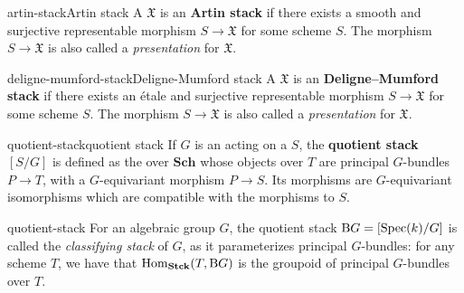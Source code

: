 \begin{topic}{artin-stack}{Artin stack}
    A  $\mathfrak{X}$ is an \textbf{Artin stack} if there exists a smooth and surjective representable morphism $S \to \mathfrak{X}$ for some scheme $S$. The morphism $S \to \mathfrak{X}$ is also called a \textit{presentation} for $\mathfrak{X}$.
\end{topic}

\begin{topic}{deligne-mumford-stack}{Deligne-Mumford stack}
    A  $\mathfrak{X}$ is an \textbf{Deligne--Mumford stack} if there exists an étale and surjective representable morphism $S \to \mathfrak{X}$ for some scheme $S$. The morphism $S \to \mathfrak{X}$ is also called a \textit{presentation} for $\mathfrak{X}$.
\end{topic}

\begin{topic}{quotient-stack}{quotient stack}
    If $G$ is an  acting on a  $S$, the \textbf{quotient stack} $[S/G]$ is defined as the  over $\textbf{Sch}$ whose objects over $T$ are principal $G$-bundles $P \to T$, with a $G$-equivariant morphism $P \to S$. Its morphisms are $G$-equivariant isomorphisms which are compatible with the morphisms to $S$.
\end{topic}

\begin{example}{quotient-stack}
    For an algebraic group $G$, the quotient stack $\textup{B}G = [\operatorname{Spec}(k) / G]$ is called the \textit{classifying stack} of $G$, as it parameterizes principal $G$-bundles: for any scheme $T$, we have that $\operatorname{Hom}_{\textbf{Stck}}(T, \textup{B}G)$ is the groupoid of principal $G$-bundles over $T$.
\end{example}

